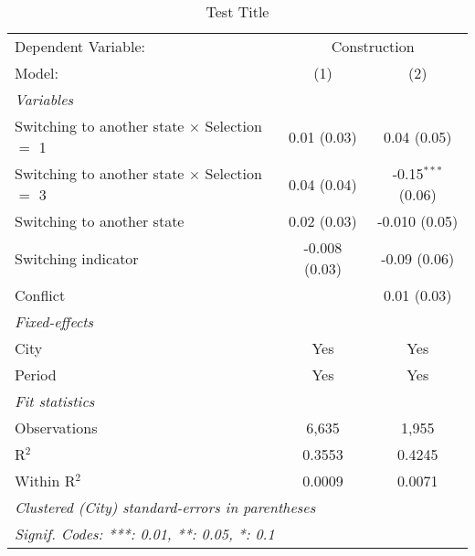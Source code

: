 \begin{table}[htbp]
   \caption{\label{tab:baseline_50y} Test Title}
   \centering
   \begin{tabular}{lcc}
      \tabularnewline \midrule \midrule
      Dependent Variable: & \multicolumn{2}{c}{Construction}\\
      Model:                                               & (1)           & (2)\\  
      \midrule
      \emph{Variables}\\
      Switching to another state $\times$ Selection $=$ 1  & 0.01 (0.03)   & 0.04 (0.05)\\   
      Switching to another state $\times$ Selection $=$ 3  & 0.04 (0.04)   & -0.15$^{***}$ (0.06)\\   
      Switching to another state                           & 0.02 (0.03)   & -0.010 (0.05)\\   
      Switching indicator                                  & -0.008 (0.03) & -0.09 (0.06)\\   
      Conflict                                             &               & 0.01 (0.03)\\   
      \midrule
      \emph{Fixed-effects}\\
      City                                                 & Yes           & Yes\\  
      Period                                               & Yes           & Yes\\  
      \midrule
      \emph{Fit statistics}\\
      Observations                                         & 6,635         & 1,955\\  
      R$^2$                                                & 0.3553        & 0.4245\\  
      Within R$^2$                                         & 0.0009        & 0.0071\\  
      \midrule \midrule
      \multicolumn{3}{l}{\emph{Clustered (City) standard-errors in parentheses}}\\
      \multicolumn{3}{l}{\emph{Signif. Codes: ***: 0.01, **: 0.05, *: 0.1}}\\
   \end{tabular}
\end{table}
